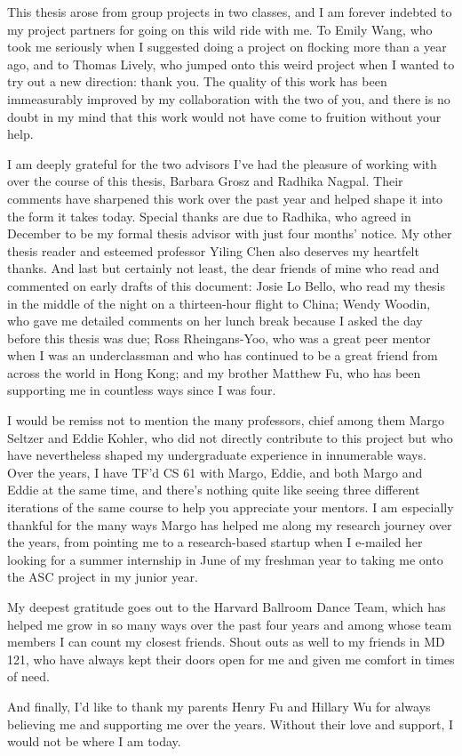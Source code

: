
This thesis arose from group projects in two classes, and I am forever indebted
to my project partners for going on this wild ride with me.
To Emily Wang, who took me seriously when I suggested doing a project on
flocking more than a year ago, and to Thomas Lively, who jumped onto this weird
project when I wanted to try out a new direction: thank you.
The quality of this work has been immeasurably improved by my collaboration
with the two of you, and there is no doubt in my mind that this work would not
have come to fruition without your help.

I am deeply grateful for the two advisors I've had the pleasure of working with
over the course of this thesis, Barbara Grosz and Radhika Nagpal.
Their comments have sharpened this work over the past year and helped shape it
into the form it takes today.
Special thanks are due to Radhika, who agreed in December to be my formal
thesis advisor with just four months' notice.
My other thesis reader and esteemed professor Yiling Chen also deserves my
heartfelt thanks.
And last but certainly not least, the dear friends of mine who read and
commented on early drafts of this document: Josie Lo Bello, who read
my thesis in the middle of the night on a thirteen-hour flight to China; Wendy
Woodin, who gave me detailed comments on her lunch break because I asked the
day before this thesis was due; Ross Rheingans-Yoo, who was a great peer
mentor when I was an underclassman and who has continued to be a great friend
from across the world in Hong Kong; and my brother Matthew Fu, who has been
supporting me in countless ways since I was four.

I would be remiss not to mention the many professors, chief among them Margo
Seltzer and Eddie Kohler, who did not directly contribute to this project but
who have nevertheless shaped my undergraduate experience in innumerable ways.
Over the years, I have TF'd CS 61 with Margo, Eddie, and both Margo and Eddie
at the same time, and there's nothing quite like seeing three different
iterations of the same course to help you appreciate your mentors.
I am especially thankful for the many ways Margo has helped me along my
research journey over the years, from pointing me to a research-based startup
when I e-mailed her looking for a summer internship in June of my freshman year
to taking me onto the ASC project in my junior year.

My deepest gratitude goes out to the Harvard Ballroom Dance Team, which has
helped me grow in so many ways over the past four years and among whose team
members I can count my closest friends.
Shout outs as well to my friends in MD 121, who have always kept their doors
open for me and given me comfort in times of need.

And finally, I'd like to thank my parents Henry Fu and Hillary Wu for always
believing me and supporting me over the years.
Without their love and support, I would not be where I am today. 
